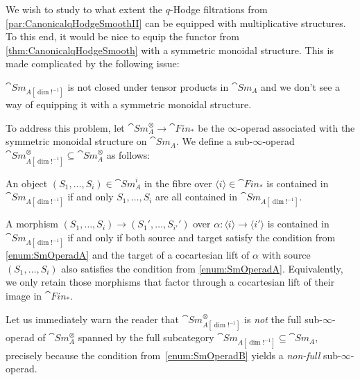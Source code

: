 \documentclass[DIV=12,numbers=enddot,leqno,bibliography=totoc]{scrartcl}
\begin{document}
	\begin{numpar}[Monoidality.]\label{par:CanonicalqHodgeSmoothMonoidal}
		We wish to study to what extent the $q$-Hodge filtrations from \cref{par:CanonicalqHodgeSmoothII} can be equipped with multiplicative structures. To this end, it would be nice to equip the functor from \cref{thm:CanonicalqHodgeSmooth} with a symmetric monoidal structure. This is made complicated by the following issue:
		\begin{alphanumerate}\itshape 
			\item[\,!\,] $\cat{Sm}_{A[\dim!^{-1}]}$ is not closed under tensor products in $\cat{Sm}_A$ and we don't see a way of equipping it with a symmetric monoidal structure.
		\end{alphanumerate}
		To address this problem, let $\cat{Sm}_A^{\otimes}\rightarrow \cat{Fin}_*$ be the $\infty$-operad associated with the symmetric monoidal structure on $\cat{Sm}_A$. We define a sub-$\infty$-operad $\cat{Sm}_{A[\dim!^{-1}]}^{\otimes}\subseteq \cat{Sm}_A^{\otimes}$ as follows:
		\begin{alphanumerate}
			\item An object $(S_1,\dotsc,S_i)\in\cat{Sm}_A^i$ in the fibre over $\langle i\rangle \in\cat{Fin}_*$ is contained in $\cat{Sm}_{A[\dim!^{-1}]}$ if and only $S_1,\dotsc,S_i$ are all contained in $\cat{Sm}_{A[\dim!^{-1}]}$.\label{enum:SmOperadA}
			\item A morphism $(S_1,\dotsc,S_i)\rightarrow (S_1',\dotsc,S_{i'}')$ over $\alpha\colon \langle i\rangle \rightarrow \langle i'\rangle$ is contained in $\cat{Sm}_{A[\dim!^{-1}]}$ if and only if both source and target satisfy the condition from \cref{enum:SmOperadA} and the target of a cocartesian lift of $\alpha$ with source $(S_1,\dotsc,S_i)$ also satisfies the condition from \cref{enum:SmOperadA}. Equivalently, we only retain those morphisms that factor through a cocartesian lift of their image in $\cat{Fin}_*$.\label{enum:SmOperadB}
		\end{alphanumerate}
		Let us immediately warn the reader that $\cat{Sm}_{A[\dim!^{-1}]}^\otimes$ is \emph{not} the full sub-$\infty$-operad of $\cat{Sm}_A^{\otimes}$ spanned by the full subcategory $\cat{Sm}_{A[\dim!^{-1}]}\subseteq \cat{Sm}_A$, precisely because the condition from~\cref{enum:SmOperadB} yields a \emph{non-full} sub-$\infty$-operad.
		

\end{numpar}
\end{document}
